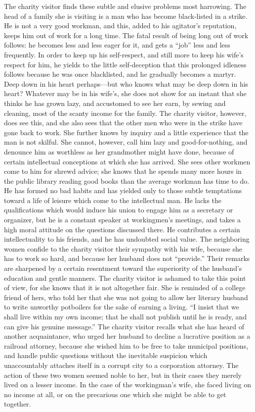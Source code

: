 \documentclass[]{article}
\begin{document}
\begin{sectionbody}
\addamsparagraph The charity visitor finds these subtle and elusive problems most
harrowing. The head of a family she is visiting is a man who has become
black-listed in a strike. He is not a very good workman, and this, added
to his agitator's reputation, keeps him out of work for a long time. The
fatal result of being long out of work follows: he becomes less and less
eager for it, and gets a ``job'' less and less frequently. In order to
keep up his self-respect, and still more to keep his wife's respect for
him, he yields to the little self-deception that this prolonged idleness
follows because he was once blacklisted, and he gradually becomes a
martyr. Deep down in his heart perhaps---but who knows what may be deep
down in his heart? Whatever may be in his wife's, she does not show for
an instant that she thinks he has grown lazy, and accustomed to see her
earn, by sewing and cleaning, most of the scanty income for the family.
The charity visitor, however, does see this, and she also sees that the
other men who were in the strike have gone back to work. She further
knows by inquiry and a little experience that the man is not skilful.
She cannot, however, call him lazy and good-for-nothing, and denounce
him as worthless as her grandmother might have done, because of certain
intellectual conceptions at which she has arrived. She sees other
workmen come to him for shrewd advice; she knows that he spends many
more hours in the public library reading good books than the average
workman has time to do. He has formed no bad habits and has yielded only
to those subtle temptations toward a life of leisure which come to the
intellectual man. He lacks the qualifications which would induce his
union to engage him as a secretary or organizer, but he is a constant
speaker at workingmen's meetings, and takes a high moral attitude on the
questions discussed there. He contributes a certain intellectuality to
his friends, and he has undoubted social value. The neighboring women
confide to the charity visitor their sympathy with his wife, because
she has to work so hard, and because her husband does not ``provide.''
Their remarks are sharpened by a certain resentment toward the
superiority of the husband's education and gentle manners. The charity
visitor is ashamed to take this point of view, for she knows that it is
not altogether fair. She is reminded of a college friend of hers, who
told her that she was not going to allow her literary husband to write
unworthy potboilers for the sake of earning a living. ``I insist that we
shall live within my own income; that he shall not publish until he is
ready, and can give his genuine message.'' The charity visitor recalls
what she has heard of another acquaintance, who urged her husband to
decline a lucrative position as a railroad attorney, because she wished
him to be free to take municipal positions, and handle public questions
without the inevitable suspicion which unaccountably attaches itself in
a corrupt city to a corporation attorney. The action of these two women
seemed noble to her, but in their cases they merely lived on a lesser
income. In the case of the workingman's wife, she faced living on no
income at all, or on the precarious one which she might be able to get
together.


\end{sectionbody}
\end{document}
